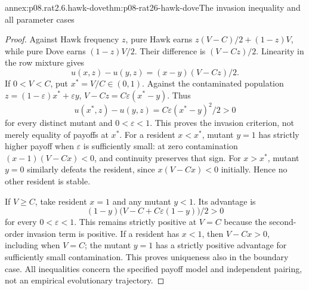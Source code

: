\begin{annexitem}{annex:p08.rat2.6.hawk-dove}{thm:p08-rat26-hawk-dove}{The invasion inequality and all parameter cases}
\begin{proof}
Against Hawk frequency \(z\), pure Hawk earns
\(z(V-C)/2+(1-z)V\), while pure Dove earns \((1-z)V/2\).
Their difference is \((V-Cz)/2\). Linearity in the row mixture gives
\[
 u(x,z)-u(y,z)=(x-y)(V-Cz)/2.
\]
If \(0<V<C\), put \(x^*=V/C\in(0,1)\). Against the
contaminated population \(z=(1-\varepsilon)x^*+\varepsilon y\),
\(V-Cz=C\varepsilon(x^*-y)\). Thus
\[
 u(x^*,z)-u(y,z)=C\varepsilon(x^*-y)^2/2>0
\]
for every distinct mutant and \(0<\varepsilon<1\). This proves
the invasion criterion, not merely equality of payoffs at \(x^*\).
For a resident \(x<x^*\), mutant \(y=1\) has strictly higher
payoff when \(\varepsilon\) is sufficiently small: at zero
contamination \((x-1)(V-Cx)<0\), and continuity preserves that
sign. For \(x>x^*\), mutant \(y=0\) similarly defeats the
resident, since \(x(V-Cx)<0\) initially. Hence no other resident
is stable.

If \(V\ge C\), take resident \(x=1\) and any mutant \(y<1\).
Its advantage is
\[
 (1-y)\bigl(V-C+C\varepsilon(1-y)\bigr)/2>0
\]
for every \(0<\varepsilon<1\). This remains strictly positive
at \(V=C\) because the second-order invasion term is positive.
If a resident has \(x<1\), then \(V-Cx>0\), including when
\(V=C\); the mutant \(y=1\) has a strictly positive advantage
for sufficiently small contamination. This proves uniqueness also
in the boundary case. All inequalities concern the specified payoff
model and independent pairing, not an empirical evolutionary trajectory.
\end{proof}
\end{annexitem}


